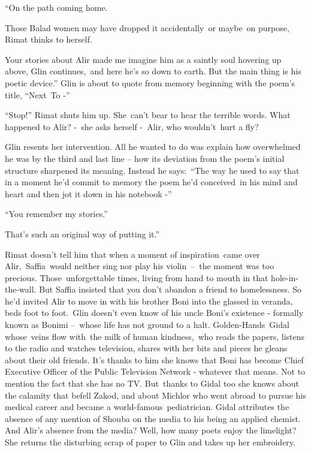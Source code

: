 \documentclass[twoside,11pt]{book}
\begin{document}
{{}``On the path coming home.{\textquotedbl}\ }

Those Balad women may have dropped it accidentally\ or maybe\ on purpose, Rimat thinks to
herself{.\ }

{{\textquotedbl}Your stories about Alir made me imagine him as a
saintly soul hovering up above,{\textquotedbl} Glin continues,\ {\textquotedbl}and here he's so down to earth. But the
main thing is his poetic device.'' Glin is about to quote from memory beginning with the poem's title, ``Next\ To {}-''
}

{{}``Stop!'' Rimat }shuts him
up{. She\ can{}'t bear to hear the terrible words. What happened to
Alir? -\ she asks herself -\ Alir, who wouldn't~hurt a fly?}

{Glin }resents her intervention. All he wanted to do
was{ explain how overwhelmed he was by the third and last line -- how
its deviation from the poem's initial structure sharpened its meaning. Instead he says:\ {}``The way he used to say
that in a moment he'd commit to memory the poem }he'd conceived\ in his mind and heart
{and then jot it down in his notebook -{}'' }

{{}``You remember my stories.'' }

{{\textquotedbl}That's such an original way of putting it.''}

{Rimat doesn{}'t tell him that when a moment of inspiration~came over
Alir,~Saffia~would neither sing nor play his violin\ {}--\ the moment was too precious. Those~unforgettable times,
living from hand to mouth in that hole-in-the-wall. But Saffia insisted that you don't abandon a friend to
homelessness. So} he{}'d invited Alir to move in with his brother Boni into the glassed in veranda, beds foot to
foot.\ Glin doesn't even know of his uncle Boni{}'s existence - formally known as Bonimi --\ whose life has not ground
to a halt. Golden-Hands\ Gidal whose\ veins flow with\ the milk of human kindness,~who reads the papers, listens to the
radio and watches television, shares with her bits and pieces he gleans about their old friends. It's thanks to him she
knows that Boni has become Chief Executive Officer of the Public Television Network - whatever that means. Not to
mention the fact that she has no TV. But~thanks to Gidal too she knows about the calamity that befell Zakod, and about
Michlor who went abroad to pursue his medical career and became a world-famous\ pediatrician. Gidal attributes the
absence of any mention of Shouba on the media to his being an applied chemist. And Alir's absence from the media? Well,
how many poets enjoy the limelight? She returns the disturbing scr{ap
of paper to Glin and takes up her embroidery.}
\end{document}
